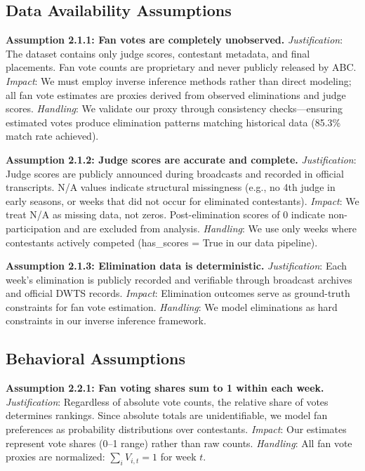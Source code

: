 \documentclass{mcmthesis}
\begin{document}
\subsection{Data Availability Assumptions}

\textbf{Assumption 2.1.1: Fan votes are completely unobserved.}
\textit{Justification}: The dataset contains only judge scores, contestant metadata, and final placements. Fan vote counts are proprietary and never publicly released by ABC.
\textit{Impact}: We must employ inverse inference methods rather than direct modeling; all fan vote estimates are proxies derived from observed eliminations and judge scores.
\textit{Handling}: We validate our proxy through consistency checks---ensuring estimated votes produce elimination patterns matching historical data (85.3\% match rate achieved).

\textbf{Assumption 2.1.2: Judge scores are accurate and complete.}
\textit{Justification}: Judge scores are publicly announced during broadcasts and recorded in official transcripts. N/A values indicate structural missingness (e.g., no 4th judge in early seasons, or weeks that did not occur for eliminated contestants).
\textit{Impact}: We treat N/A as missing data, not zeros. Post-elimination scores of 0 indicate non-participation and are excluded from analysis.
\textit{Handling}: We use only weeks where contestants actively competed (has\_scores = True in our data pipeline).

\textbf{Assumption 2.1.3: Elimination data is deterministic.}
\textit{Justification}: Each week's elimination is publicly recorded and verifiable through broadcast archives and official DWTS records.
\textit{Impact}: Elimination outcomes serve as ground-truth constraints for fan vote estimation.
\textit{Handling}: We model eliminations as hard constraints in our inverse inference framework.

\subsection{Behavioral Assumptions}

\textbf{Assumption 2.2.1: Fan voting shares sum to 1 within each week.}
\textit{Justification}: Regardless of absolute vote counts, the relative share of votes determines rankings. Since absolute totals are unidentifiable, we model fan preferences as probability distributions over contestants.
\textit{Impact}: Our estimates represent vote shares (0--1 range) rather than raw counts.
\textit{Handling}: All fan vote proxies are normalized: $\sum_{i} V_{i,t} = 1$ for week $t$.
\end{document}
